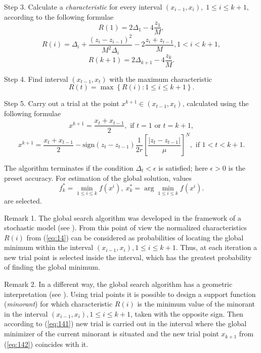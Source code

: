 \documentclass[smallcondensed]{svjour3}     %
\begin{document}
Step 3. Calculate a \textit{characteristic} for every interval $(x_{i-1}, x_i), \; 1\leq i \leq k+1,$   according to the following formulae
\[
R(1)=2\Delta_1-4\frac{z_1}{M},
\]
\begin{equation}\label{eq:14}
R(i)=\Delta_i+\frac{(z_i-z_{i-1})^2}{M^2\Delta_i}-2\frac{z_i+z_{i-1}}{M},1<i<k+1,
\end{equation}
\[
R(k+1)=2\Delta_{k+1}-4\frac{z_k}{M}.
\]

Step 4. Find interval $(x_{t-1},x_t)$ with the maximum characteristic
\begin{equation}\label{eq:141}
R(t)=\max{\left\{R(i): 1 \leq i \leq k+1\right\}}.
\end{equation}

Step 5. Carry out a trial at the point $x^{k+1}\in(x_{t-1},x_t)$, calculated using the following formulae
\[
x^{k+1} = \frac{x_t+x_{t-1}}{2}, \textrm{ if } t=1 \textrm{ or } t=k+1,
\]
\begin{equation}\label{eq:142}
x^{k+1} = \frac{x_t+x_{t-1}}{2} - \mathrm{sign}(z_t-z_{t-1})\frac{1}{2r}\left[\frac{\left|z_t-z_{t-1}\right|}{\mu}\right]^N, \textrm{ if } 1<t<k+1.
\end{equation}

The algorithm terminates if the condition $\Delta_t<\epsilon$ is satisfied; here $\epsilon>0$ is the preset accuracy. For estimation of the global solution, values
\[
f_k^\ast=\min_{1\leq i \leq k}f(x^i), \ x_k^\ast=\arg \min_{1\leq i \leq k}f(x^i).
\]
are selected.

Remark 1. The global search algorithm was developed in the framework of a stochastic model (see \cite{RefStrongin2000}). From this point of view the normalized characteristics $R(i)$ from (\ref{eq:14}) can be considered as probabilities of locating the global minimum within the interval  $(x_{i-1},x_i), 1\leq i \leq k+1$. Thus, at each iteration a new trial point is selected inside the interval, which has the greatest probability of finding the global minimum.

Remark 2. In a different way, the global search algorithm has a geometric interpretation (see \cite{RefSergeyev2001}). Using trial points it is possible to design a support function (\textit{minorant}) for which characteristic $R(i)$ is the minimum value of the minorant in the interval $(x_{i-1},x_i), 1\leq i\leq k+1$, taken with the opposite sign. Then according to (\ref{eq:141}) new trial is carried out in the interval where the global minimizer of the current minorant is situated and the new trial point $x_{k+1}$ from (\ref{eq:142}) coincides with it.
\end{document}
